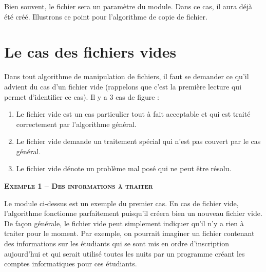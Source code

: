 Bien souvent, le fichier sera un paramètre du module. Dans ce cas, il
aura déjà été créé. Illustrons ce point pour
l'algorithme de copie de fichier.




\section{Le cas des fichiers vides}

Dans tout algorithme de manipulation de fichiers, il faut se demander ce
qu'il advient du cas d'un fichier
vide (rappelons que c'est la première lecture qui
permet d'identifier ce cas). Il y a 3 cas de figure :

\liststyleNumberingii
\begin{enumerate}
	\item 
		Le fichier vide est un cas particulier tout à fait acceptable et qui est
		traité correctement par l'algorithme général.
	\item 
		Le fichier vide demande un traitement spécial qui n'est
		pas couvert par le cas général.
	\item 
		Le fichier vide dénote un problème mal posé qui ne peut être résolu.
\end{enumerate}

{\sffamily\bfseries\scshape
Exemple 1 – Des informations à traiter}

Le module  ci-dessus est un exemple du
premier cas. En cas de fichier vide, l'algorithme
fonctionne parfaitement puisqu'il créera bien un
nouveau fichier vide. De façon générale, le fichier vide peut
simplement indiquer qu'il n'y a rien
à traiter pour le moment. Par exemple, on pourrait imaginer un fichier
contenant des informations sur les étudiants qui se sont mis en ordre
d'inscription aujourd'hui et qui
serait utilisé toutes les nuits par un programme créant les comptes
informatiques pour ces étudiants. 

